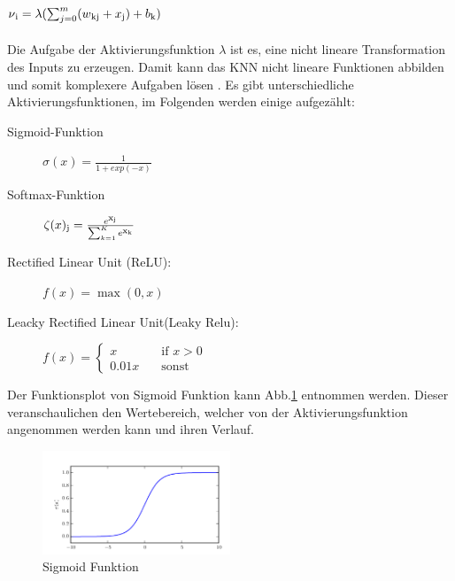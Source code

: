 \documentclass{llncs}
\begin{document}
\begin{math}
\nu\textsubscript{i} = \lambda(\sum_{j=0}^{m}(w\textsubscript{kj}+x\textsubscript{j})+b\textsubscript{k})                
\end{math}
\\\\
Die Aufgabe der Aktivierungsfunktion $\lambda$  ist es, eine nicht lineare Transformation des Inputs zu erzeugen. Damit kann das KNN nicht lineare Funktionen abbilden und somit komplexere Aufgaben lösen \cite{neuralnet}. Es gibt unterschiedliche Aktivierungsfunktionen, im Folgenden werden einige aufgezählt:
\vspace{5 mm}
\begin{description}
	\item[Sigmoid-Funktion]			
	\begin{math}
	\sigma(x)=\frac{1}{1+exp(-x)}
	\end{math}
	\vspace{5 mm}
	\item[Softmax-Funktion]	
	\begin{math}
	\zeta(x)\textsubscript{j} = \frac{e\textsuperscript{x\textsubscript{j}}}{\sum_{k=1}^{K}e\textsuperscript{x\textsubscript{k}}}
	\end{math}
	\vspace{5 mm}
	\item[Rectified Linear Unit (ReLU):]
	
	\begin{math}
	f(x)=\max(0,x) 
	\end{math}
	\vspace{5 mm}
	\item[Leacky Rectified Linear Unit(Leaky Relu):]
	
	\begin{math}
	f(x) = \begin{cases}
	x  	 & \quad \text{if } x > 0\\
	0.01x & \quad \text{sonst} 
	\end{cases}
	\end{math}
	\vspace{5 mm}
\end{description}
\vspace{5 mm}
Der Funktionsplot von Sigmoid Funktion kann Abb.\ref{fig:Bild3} entnommen werden. Dieser veranschaulichen den Wertebereich, welcher von der Aktivierungsfunktion angenommen werden kann und ihren Verlauf. 
\begin{figure}[htbp] 
	\centering
	\includegraphics[width=0.5\textwidth]{sigmoid.png}
	\caption{Sigmoid Funktion}
	\label{fig:Bild3}
\end{figure}
\end{document}
